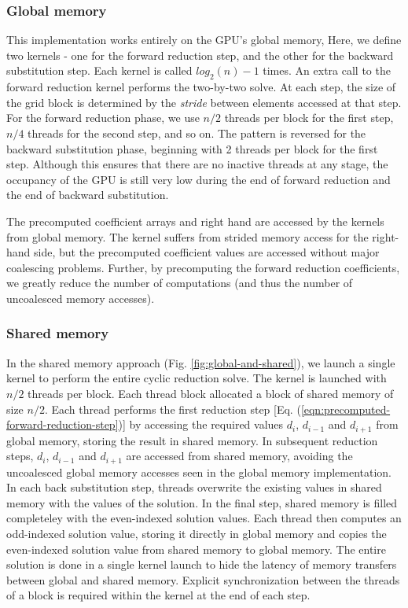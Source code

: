 \documentclass{elsarticle}
\begin{document}
\subsubsection*{Global memory}

This implementation works entirely on the GPU's global memory,
Here, we define two kernels - one for the forward reduction step,
and the other for the backward substitution step.
Each kernel is called $log_2(n)-1$ times.
An extra call to the
forward reduction kernel performs
the two-by-two solve.
At each step,
the size of the grid block is determined by the \emph{stride}
between elements accessed at that step.
For the forward reduction phase,
we use $n/2$ threads per block for the first step,
$n/4$ threads for the second step, and so on.
The pattern is reversed for the backward substitution phase,
beginning with 2 threads per block for the first step.
Although this ensures that there are no inactive threads
at any stage,
the occupancy of the GPU is still very low
during the end of forward reduction
and the end of backward substitution.

The precomputed coefficient arrays and right hand
are accessed by the kernels from global memory.
The kernel suffers from
strided memory access for the right-hand side,
but the precomputed coefficient values are accessed
without major coalescing problems.
Further, by precomputing the forward reduction coefficients,
we greatly reduce the number of computations
(and thus the number of uncoalesced memory accesses).

\subsubsection*{Shared memory}

In the shared memory approach (Fig. \ref{fig:global-and-shared}),
we launch a single kernel to perform the entire
cyclic reduction solve.
The kernel is launched with $n/2$ threads per block.
Each thread block allocated a block of shared memory of size $n/2$.
Each thread performs the first reduction step
[Eq. (\ref{eqn:precomputed-forward-reduction-step})]
by accessing the required values
$d_i$, $d_{i-1}$ and $d_{i+1}$ from global memory,
storing the result in shared memory.
In subsequent reduction steps,
$d_i$, $d_{i-1}$ and $d_{i+1}$
are accessed from shared memory,
avoiding the uncoalesced global memory accesses
seen in the global memory implementation.
In each back substitution step,
threads overwrite the existing values in shared memory
with the values of the solution.
In the final step,
shared memory is filled completeley
with the even-indexed solution values.
Each thread then computes an odd-indexed solution value,
storing it directly in global memory
and copies the even-indexed solution value
from shared memory to global memory.
The entire solution is done in a single kernel launch
to hide the latency of
memory transfers between global and shared memory.
Explicit synchronization between the threads of a block
is required within the kernel at the end of each step.
\end{document}
